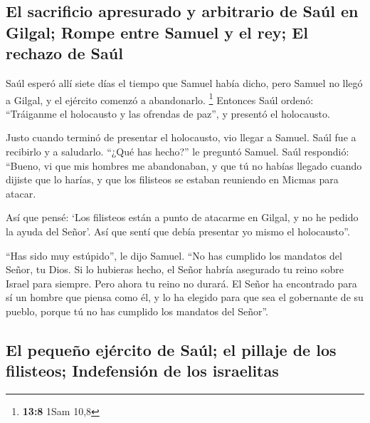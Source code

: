 \hypertarget{el-sacrificio-apresurado-y-arbitrario-de-sauxfal-en-gilgal-rompe-entre-samuel-y-el-rey-el-rechazo-de-sauxfal}{%
\subsection{El sacrificio apresurado y arbitrario de Saúl en Gilgal;
Rompe entre Samuel y el rey; El rechazo de
Saúl}\label{el-sacrificio-apresurado-y-arbitrario-de-sauxfal-en-gilgal-rompe-entre-samuel-y-el-rey-el-rechazo-de-sauxfal}}

 Saúl esperó allí siete días el tiempo que Samuel había
dicho, pero Samuel no llegó a Gilgal, y el ejército comenzó a
abandonarlo. \footnote{\textbf{13:8} 1Sam 10,8}  Entonces
Saúl ordenó: ``Tráiganme el holocausto y las ofrendas de paz'', y
presentó el holocausto.

 Justo cuando terminó de presentar el holocausto, vio
llegar a Samuel. Saúl fue a recibirlo y a saludarlo. 
``¿Qué has hecho?'' le preguntó Samuel. Saúl respondió: ``Bueno, vi que
mis hombres me abandonaban, y que tú no habías llegado cuando dijiste
que lo harías, y que los filisteos se estaban reuniendo en Micmas para
atacar.

 Así que pensé: `Los filisteos están a punto de atacarme
en Gilgal, y no he pedido la ayuda del Señor'. Así que sentí que debía
presentar yo mismo el holocausto''.

 ``Has sido muy estúpido'', le dijo Samuel. ``No has
cumplido los mandatos del Señor, tu Dios. Si lo hubieras hecho, el Señor
habría asegurado tu reino sobre Israel para siempre. 
Pero ahora tu reino no durará. El Señor ha encontrado para sí un hombre
que piensa como él, y lo ha elegido para que sea el gobernante de su
pueblo, porque tú no has cumplido los mandatos del Señor''.

\hypertarget{el-pequeuxf1o-ejuxe9rcito-de-sauxfal-el-pillaje-de-los-filisteos-indefensiuxf3n-de-los-israelitas}{%
\subsection{El pequeño ejército de Saúl; el pillaje de los filisteos;
Indefensión de los
israelitas}\label{el-pequeuxf1o-ejuxe9rcito-de-sauxfal-el-pillaje-de-los-filisteos-indefensiuxf3n-de-los-israelitas}}

